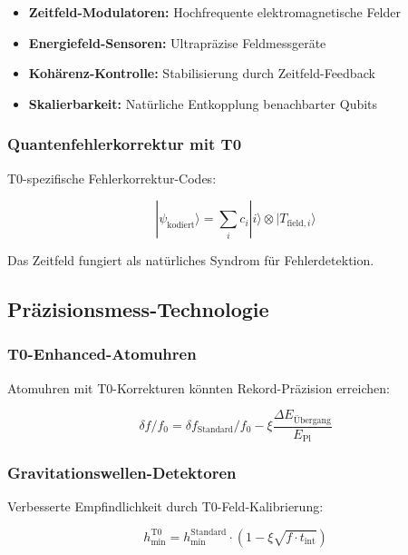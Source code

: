 \documentclass[12pt,a4paper]{article}
\newcommand{\xipar}{\xi}
\newcommand{\EPlanck}{E_{\text{Pl}}}
\begin{document}
	\begin{itemize}
		\item \textbf{Zeitfeld-Modulatoren:} Hochfrequente elektromagnetische Felder
		\item \textbf{Energiefeld-Sensoren:} Ultrapräzise Feldmessgeräte
		\item \textbf{Kohärenz-Kontrolle:} Stabilisierung durch Zeitfeld-Feedback
		\item \textbf{Skalierbarkeit:} Natürliche Entkopplung benachbarter Qubits
	\end{itemize}
	
	\subsubsection{Quantenfehlerkorrektur mit T0}
	
	T0-spezifische Fehlerkorrektur-Codes:
	
	\begin{equation}
		|\psi_{\text{kodiert}}\rangle = \sum_i c_i |i\rangle \otimes |T_{\text{field},i}\rangle
	\end{equation}
	
	Das Zeitfeld fungiert als natürliches Syndrom für Fehlerdetektion.
	
	\subsection{Präzisionsmess-Technologie}
	
	\subsubsection{T0-Enhanced-Atomuhren}
	
	Atomuhren mit T0-Korrekturen könnten Rekord-Präzision erreichen:
	
	\begin{equation}
		\delta f / f_0 = \delta f_{\text{Standard}} / f_0 - \xipar \frac{\Delta E_{\text{Übergang}}}{\EPlanck}
	\end{equation}
	
	\subsubsection{Gravitationswellen-Detektoren}
	
	Verbesserte Empfindlichkeit durch T0-Feld-Kalibrierung:
	
	\begin{equation}
		h_{\text{min}}^{\text{T0}} = h_{\text{min}}^{\text{Standard}} \cdot \left(1 - \xipar \sqrt{f \cdot t_{\text{int}}}\right)
	\end{equation}
	
\end{document}
